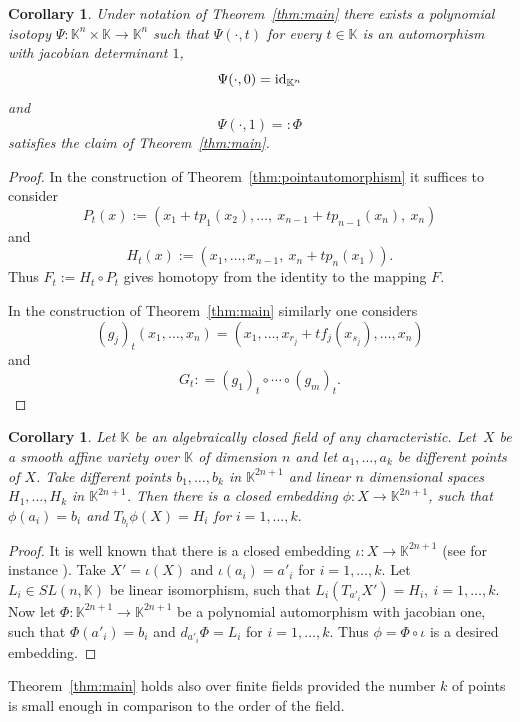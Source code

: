 \documentclass{amsart}
\newtheorem{corollary}[theorem]{Corollary}
\newcommand{\K}{\mathbb{K}}
\begin{document}
\begin{corollary}
	Under notation of Theorem~\ref{thm:main}
	there exists a polynomial isotopy $\Psi: \K^n\times \K\to \K^n$  such that $\Psi(\cdot, t)$ for every $t\in \K$ is an automorphism with jacobian determinant $1$,
	$$ \Psi(\cdot,0) = \textup{id}_{\K^n}$$ 
	and
	$$ \Psi(\cdot,1)= : \Phi $$
	satisfies the claim of Theorem~\ref{thm:main}.
\end{corollary}


\begin{proof}
In the construction of Theorem~\ref{thm:pointautomorphism} it suffices to consider 
$$ P_t(x):= (x_1+tp_{1}(x_{2}),\dots,\ x_{n-1}+tp_{n-1}(x_{n}),\ x_n) $$
and 
$$H_t(x):=(x_1,\dots, x_{n-1},\ x_n+tp_n(x_1)).$$
Thus $F_t:= H_t\circ P_t$ gives homotopy from  the identity to the mapping  $F.$ 

In the construction of Theorem~\ref{thm:main} similarly one considers
$$(g_j)_t(x_1,\dots, x_n)=(x_1,\dots,x_{r_j}+tf_j(x_{s_j}),\dots,x_n)$$
and
$$G_t: =(g_1)_t\circ\cdots\circ (g_m)_t.$$

\end{proof}

\begin{corollary}\label{glowne1}
Let $\K$ be an algebraically closed field of any characteristic. Let~$X$ be a smooth affine variety over $\K$ of dimension $n$ and let $a_1,\dots,a_k$ be different points of $X$.
Take different points $b_1,\dots, b_k$ in $\K^{2n+1}$ and  linear $n$ dimensional spaces $H_1,\dots, H_k$ in $\K^{2n+1}$.
Then there is a closed embedding $\phi: X\to \K^{2n+1}$, such that $\phi(a_i)=b_i$ and $T_{b_i} \phi(X)=H_i$ for $i=1,\dots,k.$
\end{corollary}

\begin{proof}
It is well known that there is a closed embedding $\iota: X\to \K^{2n+1}$ (see for instance \cite{jel}). Take $X'=\iota(X)$ and $\iota(a_i)=a'_i$ for $ i=1,\dots, k.$ Let $L_i\in SL(n,\K)$ be linear isomorphism, such that
$L_i(T_{a'_i} X')=H_i,\ i=1,\dots, k.$ Now let $\Phi:\K^{2n+1}\to\K^{2n+1}$ be a polynomial automorphism with jacobian one, such that $\Phi(a'_i)=b_i$ and $d_{a'_i}\Phi=L_i$
for $i=1,\dots, k.$ Thus $\phi=\Phi\circ\iota$ is a desired embedding.
\end{proof}



\begin{remark}	
{\rm Theorem~\ref{thm:main}  holds also over finite fields provided the number $k$ of points is small enough in comparison to the order of the field.}
\end{remark}
\end{document}
